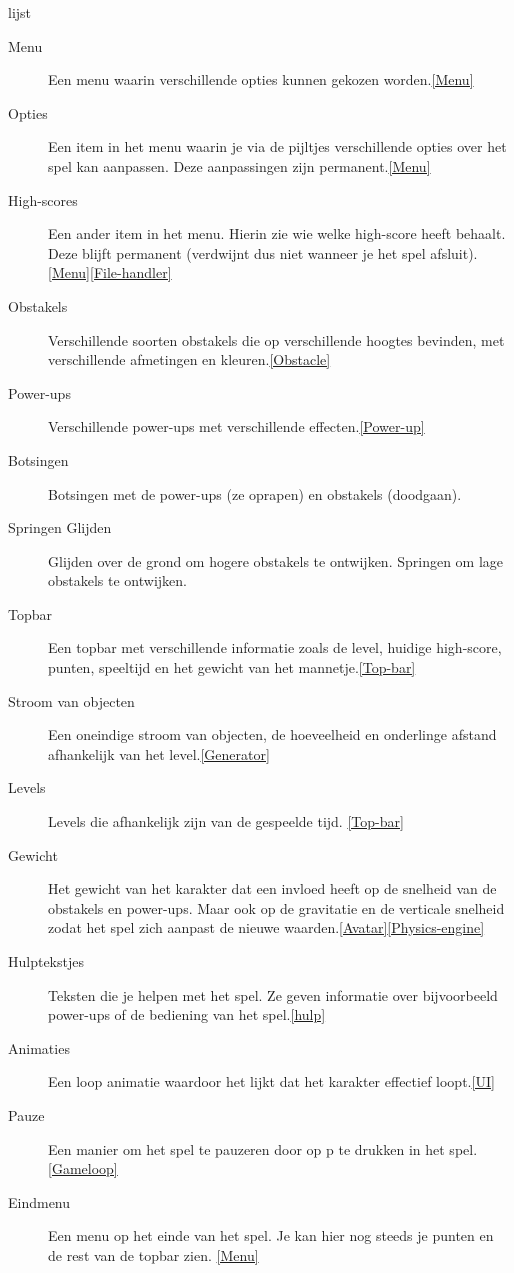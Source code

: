 \documentclass{article}
\begin{document}
lijst 
\begin{description}
 \item[Menu] Een menu waarin verschillende opties kunnen gekozen worden.\ref{Menu}
 \item[Opties] Een item in het menu waarin je via de pijltjes verschillende opties over het spel kan aanpassen. Deze aanpassingen zijn permanent.\ref{Menu}
 \item[High-scores] Een ander item in het menu. Hierin zie wie welke high-score heeft behaalt. Deze blijft permanent (verdwijnt dus niet wanneer je het spel afsluit).\ref{Menu}\ref{File-handler}
 \item[Obstakels] Verschillende soorten obstakels die op verschillende hoogtes bevinden, met verschillende afmetingen en kleuren.\ref{Obstacle}
 \item[Power-ups] Verschillende power-ups met verschillende effecten.\ref{Power-up}
 \item[Botsingen] Botsingen met de power-ups (ze oprapen) en obstakels (doodgaan).
 \item[Springen Glijden] Glijden over de grond om hogere obstakels te ontwijken. Springen om lage obstakels te ontwijken.
 \item[Topbar] Een topbar met verschillende informatie zoals de level, huidige high-score, punten, speeltijd en het gewicht van het mannetje.\ref{Top-bar}
 \item[Stroom van objecten] Een oneindige stroom van objecten, de hoeveelheid en onderlinge afstand afhankelijk van het level.\ref{Generator}
 \item[Levels] Levels die afhankelijk zijn van de gespeelde tijd. \ref{Top-bar}
 \item[Gewicht] Het gewicht van het karakter dat een invloed heeft op de snelheid van de obstakels en power-ups. Maar ook op de gravitatie en de verticale snelheid zodat het spel zich aanpast de nieuwe waarden.\ref{Avatar}\ref{Physics-engine}
 \item[Hulptekstjes] Teksten die je helpen met het spel. Ze geven informatie over bijvoorbeeld power-ups of de bediening van het spel.\ref{hulp}
 \item[Animaties] Een loop animatie waardoor het lijkt dat het karakter effectief loopt.\ref{UI}
 \item[Pauze] Een manier om het spel te pauzeren door op p te drukken in het spel.\ref{Gameloop}
 \item[Eindmenu] Een menu op het einde van het spel. Je kan hier nog steeds je punten en de rest van de topbar zien. \ref{Menu}
 
\end{description}
\end{document}
